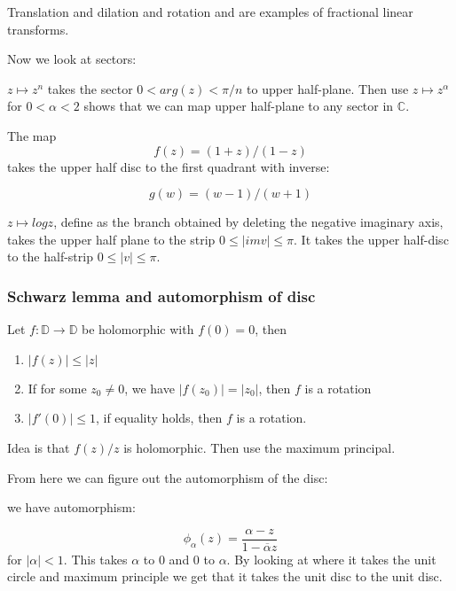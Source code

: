 \documentclass[main.tex]{subfiles}
\begin{document}
Translation and dilation and rotation and are examples of fractional linear transforms.

Now we look at sectors:

\begin{example}
$z \mapsto z^n$ takes the sector $0 < arg(z) < \pi/n$ to upper half-plane.
Then use $z \mapsto z^\alpha$ for $0 < \alpha < 2$ shows that we can map upper half-plane to any sector in $\mathbb{C}$.
\end{example}

\begin{example}
The map 
$$
f(z) = (1 + z)/(1 -z)
$$
takes the upper half disc to the first quadrant with inverse:

$$
g(w) = (w-1)/(w+1)
$$
\end{example}

\begin{example}
$z \mapsto log z$, define as the branch obtained by deleting the negative imaginary axis, takes the upper half plane to the strip $0 \leq |im v| \leq \pi$. It takes the upper half-disc to the half-strip $0 \leq |v| \leq \pi$.
\end{example}


\subsubsection{Schwarz lemma and automorphism of disc}

\begin{lemma}
Let $f: \mathbb{D} \rightarrow \mathbb{D}$ be holomorphic with $f(0) = 0$, then
\begin{enumerate}
    \item $|f(z)| \leq |z|$
    \item If for some $z_0 \neq 0$, we have $|f(z_0)| = |z_0|$, then $f$ is a rotation
    \item $|f'(0)| \leq 1$, if equality holds, then $f$ is a rotation.
\end{enumerate}
\end{lemma}

Idea is that $f(z)/z$ is holomorphic. Then use the maximum principal.

From here we can figure out the automorphism of the disc:

we have automorphism:

$$
\phi_\alpha(z) = \frac{\alpha - z}{1 - \overline{\alpha} z}
$$
for $|\alpha| < 1$. This takes $\alpha$ to $0$ and $0$ to $\alpha$. By looking at where it takes the unit circle and maximum principle we get that it takes the unit disc to the unit disc.
\end{document}
